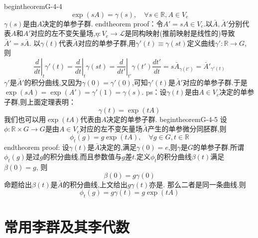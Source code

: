 \documentclass[../main.tex]{subfiles}
\begin{document}
begin{theorem}{}{G-4-4}	$$ \exp(sA) = \gamma(s),\quad \forall s\in \mathbb{R},A\in V_e $$	$\gamma(s)$是由$A$决定的单参子群.
end{theorem}
proof：令$A' =sA \in V_e$.以$\bar{A},\bar{A}'$分别代表$A$和$A'$对应的左不变矢量场,$\eta : V_e\rightarrow \mathscr{L}$是同构映射(推前映射是线性的)导致$\bar{A}' =s\bar{A}$.
以$\gamma(t)$代表$\bar{A}$对应的单参子群,用$\gamma'(t)\equiv \gamma(st)$定义曲线$\gamma' :\mathbb{R}\rightarrow G$,
则
$$ \left.\frac{d}{dt}\right|_t \gamma'(t) = \left.\frac{d}{dt}\right|_t \gamma(st) = \left.\frac{d}{dt'}\right|_{t'}\gamma(t')\frac{dt'}{dt} = s\bar{A}_{\gamma(t')} = \bar{A}'_{\gamma'(t)} $$
$\gamma'$是$\bar{A}'$的积分曲线,又因为$\gamma(0) = \gamma'(0)$,可知$\gamma'(t)$是$\bar{A}'$对应的单参子群.于是$\exp(sA) = \exp(A') = \gamma'(1) = \gamma(s)$.
ps：设$\gamma(t)$是由$A\in V_e$决定的单参子群,则上面定理表明：
    $$ \gamma(t)= \exp(tA) $$
我们也可以用$\exp(tA)$代表由$A$决定的单参子群.
begin{theorem}{}{G-4-5}	设$\phi:\mathbb{R} \times G\rightarrow G$是由$A\in V_e$对应的左不变矢量场$\bar{A}$产生的单参微分同胚群,则	$$ \phi_t(g)= g\exp(tA),\quad \forall g\in G, t\in \mathbb{R} $$
end{theorem}
proof: 设$\gamma(t)$是$\bar{A}$决定的,满足$\gamma(0)=e$,则$\gamma$是$G$的单参子群.所谓$\phi_t(g)$是过$g$的积分曲线,而且参数值与$g$差$t$.定义$\phi_t$的积分曲线$\beta(t)$满足$\beta(0) = g$,
则
    $$ \beta(0) = g\gamma(0) $$
命题给出$\beta(t)$是$\bar{A}$的积分曲线,上文给出$g\gamma(t)$亦是.
那么二者是同一条曲线.则
$$ \phi_t(g) = g\gamma(t) = g\exp(tA) $$




\chapter{常用李群及其李代数}
\end{document}
